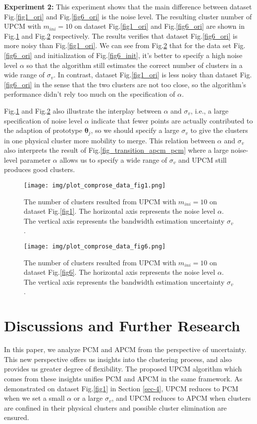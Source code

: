 \documentclass[journal,transmag]{IEEEtran}
\begin{document}
\textbf{Experiment 2:} This experiment shows that the main difference between dataset Fig.\ref{fig1_ori} and Fig.\ref{fig6_ori} is the noise level.
The resulting cluster number of UPCM with $m_{ini}=10$ on dataset Fig.\ref{fig1_ori} and Fig.\ref{fig6_ori} are shown in Fig.\ref{fig1_comprose} and Fig.\ref{fig6_comprose} respectively. The results verifies that dataset Fig.\ref{fig6_ori} is more noisy than Fig.\ref{fig1_ori}.
We can see from Fig.\ref{fig6_comprose} that for the data set Fig.\ref{fig6_ori} and initialization of Fig.\ref{fig6_init}, it's better to specify a high noise level $\alpha$ so that the algorithm still estimates the correct number of clusters in a wide range of $\sigma_v$. In contrast, dataset Fig.\ref{fig1_ori} is less noisy than dataset Fig.\ref{fig6_ori} in the sense that the two clusters are not too close, so the algorithm's performance didn't rely too much on the specification of $\alpha$.

Fig.\ref{fig1_comprose} and Fig.\ref{fig6_comprose} also illustrate the interplay between $\alpha$ and $\sigma_v$, i.e., a large specification of noise level $\alpha$ indicate that fewer points are actually contributed to the adaption of prototype $\boldsymbol{\theta}_j$, so we should specify a large $\sigma_v$ to give the clusters in one physical cluster more mobility to merge. This relation between $\alpha$ and $\sigma_v$ also interprets the result of
Fig.\ref{fig_transition_apcm_pcm} where a large noise-level parameter $\alpha$ allows us to specify a wide range of $\sigma_v$ and UPCM still produces good clusters.
\begin{figure}[htb]
\centering
\texttt{[image: img/plot\_comprose\_data\_fig1.png]}
\caption{\label{fig1_comprose}The number of clusters resulted from UPCM with $m_{ini}=10$ on dataset Fig.\ref{fig1}. The horizontal axis represents the noise level $\alpha$. The vertical axis represents the bandwidth estimation uncertainty $\sigma_v$.}
\end{figure}
\begin{figure}[htb]
\centering
\texttt{[image: img/plot\_comprose\_data\_fig6.png]}
\caption{\label{fig6_comprose}The number of clusters resulted from UPCM with $m_{ini}=10$ on dataset Fig.\ref{fig6}. The horizontal axis represents the noise level $\alpha$. The vertical axis represents the bandwidth estimation uncertainty $\sigma_v$.}
\end{figure}

\section{Discussions and Further Research}
\label{sec-5}
In this paper, we analyze PCM and APCM from the perspective of uncertainty. This new perspective offers us insights into the clustering process, and also provides us greater degree of flexibility.
The proposed UPCM algorithm which comes from these insights unifies PCM and APCM in the same framework. As demonstrated on dataset Fig.\ref{fig1} in Section \ref{sec-4}, UPCM reduces to PCM when we set a small $\alpha$ or a large $\sigma_v$, and UPCM reduces to APCM when clusters are confined in their physical clusters and possible cluster elimination are ensured.
\end{document}
